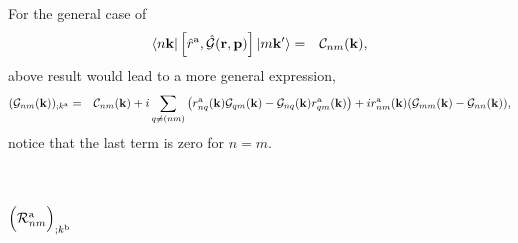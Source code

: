 \documentclass[floatfix,prb,aps,superscriptaddress,11pt,preprint]{revtex4}
\begin{document}
For the general
case of
\begin{eqnarray}\label{a.8}
\langle n\mathbf{k} |
\left[\hat r^{\mathrm{a}},\hat{{\mathbf{\cal G}}}(\mathbf{r},\mathbf{p})\right]
| m\mathbf{k}' \rangle
&=&
{\mathbf{\cal C}}_{nm}(\mathbf{k})
,
\end{eqnarray}
above result would lead to a more general expression, 
\begin{eqnarray}\label{a.9}
({\mathbf{\cal G}}_{nm}(\mathbf{k}))_{;k^{\mathrm{a}}}
&=&
{\mathbf{\cal C}}_{nm}(\mathbf{k})
+
i\sum_{q\ne(nm)}
\left(
r_{nq}^{\mathrm{a}} (\mathbf{k})
{\mathbf{\cal G}}_{qm}(\mathbf{k})
-
{\mathbf{\cal G}}_{nq}(\mathbf{k})
r_{qm}^{\mathrm{a}} (\mathbf{k})
\right)
+ir_{nm}^{\mathrm{a}} (\mathbf{k}) ({\mathbf{\cal G}}_{mm}(\mathbf{k})-{\mathbf{\cal G}}_{nn}(\mathbf{k}))
,
\nonumber\\
\end{eqnarray}
notice that the last term is zero for $n=m$.

\section{$\Big({\cal R}^{\mathrm{a}}_{nm}\Big)_{;k^{\mathrm{b}}}$}\label{calr}
\end{document}
